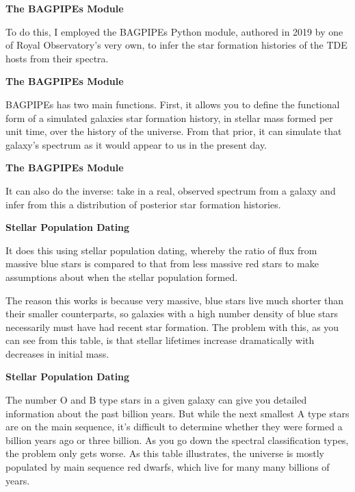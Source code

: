 \documentclass[a4paper,11pt]{article}
\begin{document}
\noindent \newline \textbf{The BAGPIPEs Module}

\noindent \newline To do this, I employed the BAGPIPEs Python module, authored in 2019 by one of
Royal Observatory's very own, to infer the star formation histories of the TDE
hosts from their spectra.

\noindent \newline \textbf{The BAGPIPEs Module}

\noindent \newline BAGPIPEs has two main functions. First, it allows you to define the functional
form of a simulated galaxies star formation history, in stellar mass formed per
unit time, over the history of the universe. From that prior, it can simulate
that galaxy's spectrum as it would appear to us in the present day.

\noindent \newline \textbf{The BAGPIPEs Module}

\noindent \newline It can also do the inverse: take in a real, observed spectrum from a galaxy and
infer from this a distribution of posterior star formation histories.

\noindent \newline \textbf{Stellar Population Dating}

\noindent \newline It does this using stellar population dating, whereby the ratio of flux from
massive blue stars is compared to that from less massive red stars to make assumptions
about when the stellar population formed.

\noindent \newline The reason this works is because very massive, blue stars live much shorter than
their smaller counterparts, so galaxies with a high number density of blue stars
necessarily must have had recent star formation. The problem with this, as you
can see from this table, is that stellar lifetimes increase dramatically with
decreases in initial mass.

\noindent \newline \textbf{Stellar Population Dating}

\noindent \newline The number O and B type stars in a given galaxy can give you detailed
information about the past billion years. But while the next smallest A type
stars are on the main sequence, it's difficult to determine whether they were
formed a billion years ago or three billion. As you go down the spectral classification
types, the problem only gets worse. As this table illustrates, the universe is
mostly populated by main sequence red dwarfs, which live for many many billions
of years.
\end{document}
